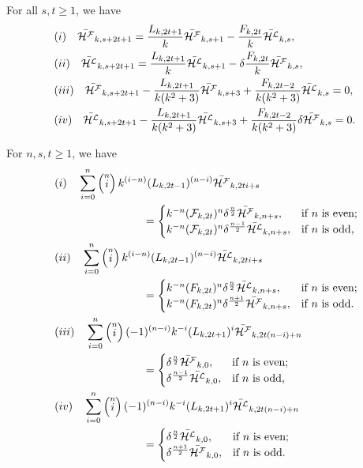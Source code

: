 \begin{theorem}For all $s, t\geq 1$, we have\label{3.10t}
\begin{align*}
&(i)\quad\bar{{\mathcal{H^F}}}_{k,s+2t+1}=\dfrac{{L}_{k,2t+1}}{k}\bar{{\mathcal{H^F}}}_{k,s+1}-\dfrac{{F}_{k,2t}}{k}\bar{{\mathcal{H^L}}}_{k,s},\\
&(ii)\quad\bar{{\mathcal{H^L}}}_{k,s+2t+1}=\dfrac{{L}_{k,2t+1}}{k}\bar{{\mathcal{H^L}}}_{k,s+1}-\delta\dfrac{{F}_{k,2t}}{k}\bar{{\mathcal{H^F}}}_{k,s},\\
&(iii)\quad\bar{{\mathcal{H^F}}}_{k,s+2t+1}-\dfrac{{L}_{k,2t+1}}{k(k^2+3)}\bar{{\mathcal{H^F}}}_{k,s+3}+\dfrac{{F}_{k,2t-2}}{k(k^2+3)}\bar{{\mathcal{H^L}}}_{k,s}=0,\\
&(iv)\quad\bar{{\mathcal{H^L}}}_{k,s+2t+1}-\dfrac{{L}_{k,2t+1}}{k(k^2+3)}\bar{{\mathcal{H^L}}}_{k,s+3}+\dfrac{{F}_{k,2t-2}}{k(k^2+3)}\delta\bar{{\mathcal{H^F}}}_{k,s}=0.
\end{align*}
\end{theorem}
\begin{theorem}For $n,s, t\geq 1$, we have\label{3.11t}
\begin{align*}
&(i)\quad\sum\limits_{i=0}^{n}\left( \stackrel{n}{i}\right)k^{(i-n)}({L}_{k,2t-1})^{(n-i)}\bar{{\mathcal{H^F}}}_{k,2ti+s}\\
&\qquad\qquad\qquad\qquad=\begin{cases} 
k^{-n}(\mathcal{F}_{k,2t})^n\delta^{\frac{n}{2}}\bar{{\mathcal{H^F}}}_{k,n+s},& \text{if $n$ is even;}\\
k^{-n}(\mathcal{F}_{k,2t})^n\delta^{\frac{n-1}{2}}\bar{{\mathcal{H^L}}}_{k,n+s},& \text{if $n$ is odd,}\end{cases} \\
&(ii)\quad\sum\limits_{i=0}^{n}\left( \stackrel{n}{i}\right)k^{(i-n)}({L}_{k,2t-1})^{(n-i)}\bar{{\mathcal{H^L}}}_{k,2ti+s}\\
&\qquad\qquad\qquad\qquad=\begin{cases} 
k^{-n}({F}_{k,2t})^n\delta^{\frac{n}{2}}\bar{{\mathcal{H^L}}}_{k,n+s},& \text{if $n$ is even;}\\
k^{-n}({F}_{k,2t})^n\delta^{\frac{n+1}{2}}\bar{{\mathcal{H^F}}}_{k,n+s},& \text{if $n$ is odd.}
\end{cases} \\
&(iii)\quad\sum\limits_{i=0}^{n}\left( \stackrel{n}{i}\right)(-1)^{(n-i)}k^{-i}(L_{k,2t+1})^i\bar{{\mathcal{H^F}}}_{k,2t(n-i)+n}\\
&\qquad\qquad\qquad\qquad=\begin{cases} 
{\delta}^{\frac{n}{2}}\bar{{\mathcal{H^F}}}_{k,0},& \text{if $n$ is even;}\\
{\delta}^{\frac{n-1}{2}}\bar{{\mathcal{H^L}}}_{k,0},& \text{if $n$ is odd,}
\end{cases} \\
&(iv)\quad\sum\limits_{i=0}^{n}\left( \stackrel{n}{i}\right)(-1)^{(n-i)}k^{-i}(L_{k,2t+1})^i\bar{{\mathcal{H^L}}}_{k,2t(n-i)+n}\\\
&\qquad\qquad\qquad\qquad=\begin{cases} 
{\delta}^{\frac{n}{2}}\bar{{\mathcal{H^L}}}_{k,0},& \text{if $n$ is even;}\\
{\delta}^{\frac{n+1}{2}}\bar{{\mathcal{H^F}}}_{k,0},& \text{if $n$ is odd.}
\end{cases} 
\end{align*}
\end{theorem}

